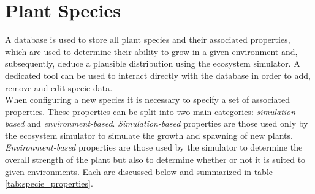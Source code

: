 \section{Plant Species} \label{sec:plant_species}

A database is used to store all plant species and their associated properties, which are used to determine their ability to grow in a given environment and, subsequently, deduce a plausible distribution using the ecosystem simulator. A dedicated tool can be used to interact directly with the database in order to add, remove and edit specie data.\\
When configuring a new species it is necessary to specify a set of associated properties. These properties can be split into two main categories: \textit{simulation-based} and \textit{environment-based}. \textit{Simulation-based} properties are those used only by the ecosystem simulator to simulate the growth and spawning of new plants. \textit{Environment-based} properties are those used by the simulator to determine the overall strength of the plant but also to determine whether or not it is suited to given environments. Each are discussed below and summarized in table \ref{tab:specie_properties}.\\

